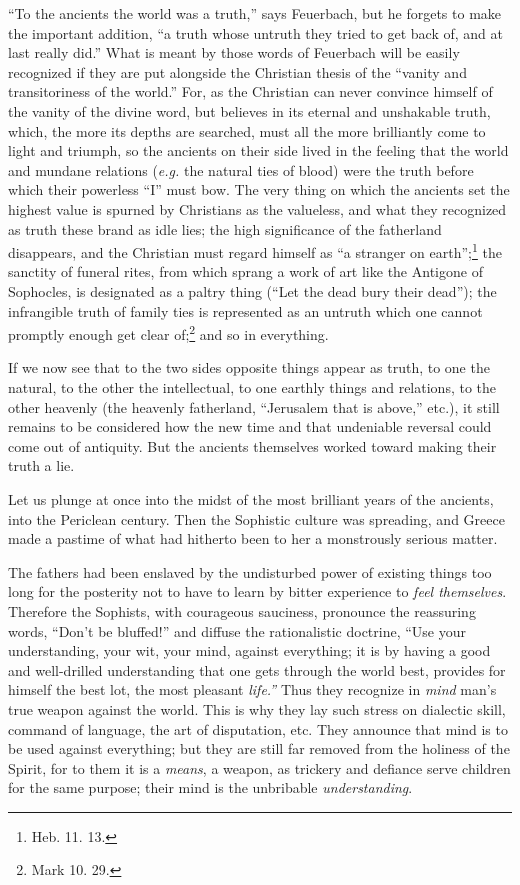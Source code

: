 ``To the ancients the world was a truth,'' says Feuerbach, but he forgets to 
make the important addition, ``a truth whose untruth they tried to get back 
of, and at last really did.'' What is meant by those words of Feuerbach will 
be easily recognized if they are put alongside the Christian thesis of the 
``vanity and transitoriness of the world.'' For, as the Christian can never 
convince himself of the vanity of the divine word, but believes in its eternal 
and unshakable truth, which, the more its depths are searched, must all the 
more brilliantly come to light and triumph, so the ancients on their side 
lived in the feeling that the world and mundane relations (\textit{e.g.} the 
natural ties of blood) were the truth before which their powerless ``I'' 
must bow. The very thing on which the ancients set the highest value is 
spurned by Christians as the valueless, and what they recognized as truth 
these brand as idle lies; the high significance of the fatherland disappears, 
and the Christian must regard himself as ``a stranger on 
earth'';\footnote{Heb. 11. 13.} the sanctity of funeral rites, from which 
sprang a work of art like the Antigone of Sophocles, is designated as a paltry 
thing (``Let the dead bury their dead''); the infrangible truth of family 
ties is represented as an untruth which one cannot promptly enough get clear 
of;\footnote{Mark 10. 29.} and so in everything.

If we now see that to the two sides opposite things appear as truth, to one 
the natural, to the other the intellectual, to one earthly things and 
relations, to the other heavenly (the heavenly fatherland, ``Jerusalem that 
is above,'' etc.), it still remains to be considered how the new time and 
that undeniable reversal could come out of antiquity. But the ancients 
themselves worked toward making their truth a lie.

Let us plunge at once into the midst of the most brilliant years of the 
ancients, into the Periclean century. Then the Sophistic culture was 
spreading, and Greece made a pastime of what had hitherto been to her a 
monstrously serious matter.

The fathers had been enslaved by the undisturbed power of existing things too 
long for the posterity not to have to learn by bitter experience to 
\textit{feel themselves}. Therefore the Sophists, with courageous sauciness, 
pronounce the reassuring words, ``Don't be bluffed!'' and diffuse the 
rationalistic doctrine, ``Use your understanding, your wit, your mind, 
against everything; it is by having a good and well-drilled understanding that 
one gets through the world best, provides for himself the best lot, the most 
pleasant \textit{life.''} Thus they recognize in \textit{mind} man's true 
weapon against the world. This is why they lay such stress on dialectic skill, 
command of language, the art of disputation, etc. They announce that mind is 
to be used against everything; but they are still far removed from the 
holiness of the Spirit, for to them it is a \textit{means}, a weapon, as 
trickery and defiance serve children for the same purpose; their mind is the 
unbribable \textit{understanding}.

